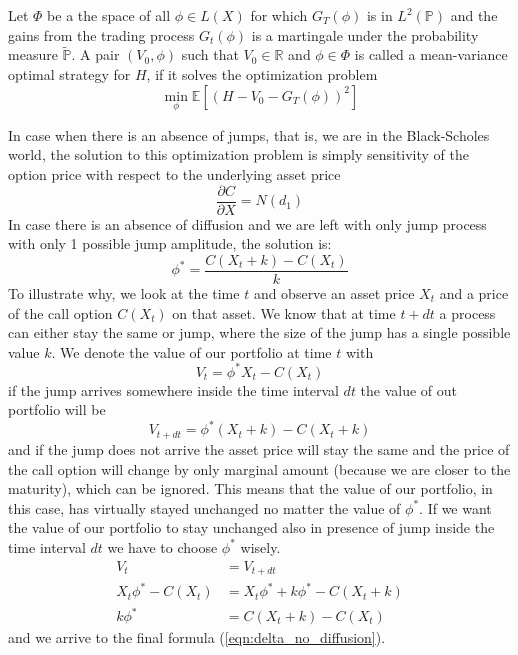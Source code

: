 \documentclass[times, utf8, diplomski]{fer}
\begin{document}
\begin{definition}
	Let $\Phi$ be a the space of all $\phi \in L(X)$ for which $G_T(\phi)$ is in $L^2(\mathbb{P})$ and the gains from the trading process $G_t(\phi)$ is a martingale under the probability measure $\tilde{\mathbb{P}}$. A pair $(V_0, \phi)$ such that $V_0 \in \mathbb{R}$ and $\phi \in \Phi$ is called a mean-variance optimal strategy for $H$, if it solves the optimization problem 
	\begin{equation} \label{eqn:min_hedge_error}
		\min_{\phi}\mathbb{E}\left[ (H - V_0 - G_T(\phi))^2 \right]
	\end{equation}
\end{definition}
In case when there is an absence of jumps, that is, we are in the Black-Scholes world, the solution to this optimization problem is simply sensitivity of the option price with respect to the underlying asset price
\begin{equation*}
	\frac{\partial C}{\partial X} = N(d_1)
\end{equation*}
In case there is an absence of diffusion and we are left with only jump process with only 1 possible jump amplitude, the solution is:
\begin{equation} \label{eqn:delta_no_diffusion}
	\phi^* = \frac{C(X_t + k) - C(X_t)}{k}
\end{equation}
To illustrate why, we look at the time $t$ and observe an asset price $X_t$ and a price of the call option $C(X_t)$ on that asset. We know that at time $t+dt$ a process can either stay the same or jump, where the size of the jump has a single possible value $k$. We denote the value of our portfolio at time $t$ with $$V_t = \phi^* X_t - C(X_t)$$ if the jump arrives somewhere inside the time interval $dt$ the value of out portfolio will be
$$V_{t+dt} = \phi^* (X_t + k) - C(X_t + k)$$
and if the jump does not arrive the asset price will stay the same and the price of the call option will change by only marginal amount (because we are closer to the maturity), which can be ignored. This means that the value of our portfolio, in this case, has virtually stayed unchanged no matter the value of $\phi^*$. If we want the value of our portfolio to stay unchanged also in presence of jump inside the time interval $dt$ we have to choose $\phi^*$ wisely.
\begin{align*}
	V_t &= V_{t+dt} \\
	X_t\phi^* - C(X_t) &=  X_t\phi^*+ k\phi^* - C(X_t + k) \\
	k\phi^* &= C(X_t + k) - C(X_t)
\end{align*} and we arrive to the final formula (\ref{eqn:delta_no_diffusion}).
\end{document}
